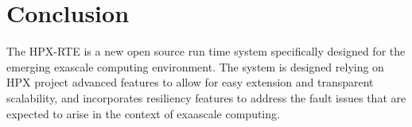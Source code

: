 \chapter{Conclusion}
\label{sec:Conclusion}

The HPX-RTE is a new open source run time system specifically designed for the emerging exascale computing environment. The system is designed relying on HPX project advanced features to allow for easy extension and transparent scalability, and incorporates resiliency features to address the fault issues that are expected to arise in the context of exaascale computing.
